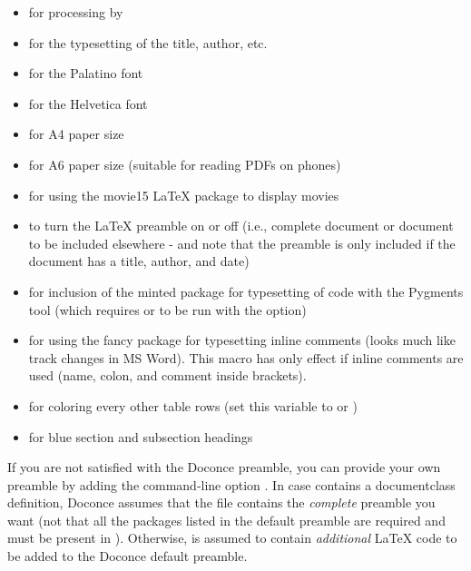 \documentclass[%
oneside,                 %
final,                   %
10pt]{article}
\begin{document}
\begin{itemize}
 \item {} for processing by 

 \item {} for the typesetting of the title, author, etc.

 \item {} for the Palatino font

 \item {} for the Helvetica font

 \item {} for A4 paper size

 \item {} for A6 paper size (suitable for reading PDFs on phones)

 \item {} for using the movie15 {\LaTeX} package to display movies

 \item {} to turn the {\LaTeX} preamble on or off (i.e., complete document
   or document to be included elsewhere - and note that
   the preamble is only included
   if the document has a title, author, and date)

 \item {} for inclusion of the minted package for typesetting of
   code with the Pygments tool (which requires 
   or  to be run with the  option)

 \item {} for using the fancy  package for typesetting
   inline comments (looks much like track changes in MS Word). This
   macro has only effect if inline comments are used (name, colon,
   and comment inside brackets).

 \item {} for coloring every other table rows (set this
   variable to  or )

 \item {} for blue section and subsection headings
\end{itemize}

\noindent
If you are not satisfied with the Doconce preamble, you can provide
your own preamble by adding the command-line option .
In case  contains a documentclass definition, Doconce assumes
that the file contains the \emph{complete} preamble you want (not that all
the packages listed in the default preamble are required and must be
present in ). Otherwise,  is assumed to contain
\emph{additional} {\LaTeX} code to be added to the Doconce default preamble.
\end{document}
